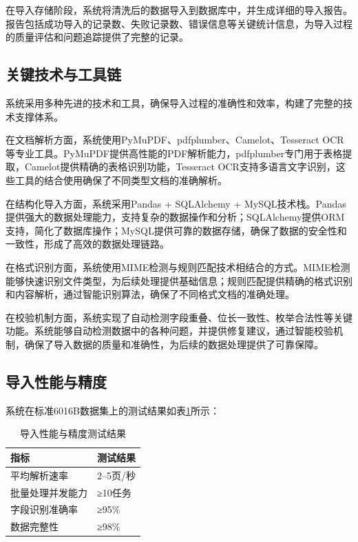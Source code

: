 在导入存储阶段，系统将清洗后的数据导入到数据库中，并生成详细的导入报告。报告包括成功导入的记录数、失败记录数、错误信息等关键统计信息，为导入过程的质量评估和问题追踪提供了完整的记录。

\subsection{关键技术与工具链}

系统采用多种先进的技术和工具，确保导入过程的准确性和效率，构建了完整的技术支撑体系。

在文档解析方面，系统使用PyMuPDF、pdfplumber、Camelot、Tesseract OCR等专业工具。PyMuPDF提供高性能的PDF解析能力，pdfplumber专门用于表格提取，Camelot提供精确的表格识别功能，Tesseract OCR支持多语言文字识别，这些工具的结合使用确保了不同类型文档的准确解析。

在结构化导入方面，系统采用Pandas + SQLAlchemy + MySQL技术栈。Pandas提供强大的数据处理能力，支持复杂的数据操作和分析；SQLAlchemy提供ORM支持，简化了数据库操作；MySQL提供可靠的数据存储，确保了数据的安全性和一致性，形成了高效的数据处理链路。

在格式识别方面，系统使用MIME检测与规则匹配技术相结合的方式。MIME检测能够快速识别文件类型，为后续处理提供基础信息；规则匹配提供精确的格式识别和内容解析，通过智能识别算法，确保了不同格式文档的准确处理。

在校验机制方面，系统实现了自动检测字段重叠、位长一致性、枚举合法性等关键功能。系统能够自动检测数据中的各种问题，并提供修复建议，通过智能校验机制，确保了导入数据的质量和准确性，为后续的数据处理提供了可靠保障。

\subsection{导入性能与精度}

系统在标准6016B数据集上的测试结果如表\ref{table:import_performance}所示：

\begin{table}[H]
    \caption{导入性能与精度测试结果}
    \label{table:import_performance}
    \centering
    \begin{tabular}{|l|l|}
        \hline
        \textbf{指标} & \textbf{测试结果} \\
        \hline
        平均解析速率 & 2–5页/秒 \\
        批量处理并发能力 & ≥10任务 \\
        字段识别准确率 & ≥95\% \\
        数据完整性 & ≥98\% \\
        \hline
    \end{tabular}
\end{table}

